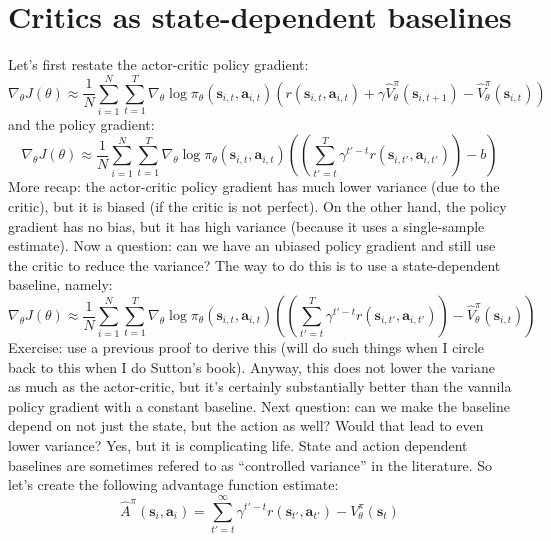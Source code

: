 \documentclass{report}
\begin{document}
\section{Critics as state-dependent baselines}
Let's first restate the actor-critic policy gradient:
\begin{equation}
	\nabla_\theta J(\theta) \approx \frac{1}{N} \sum_{i=1}^{N} \sum_{t=1}^{T} \nabla_{\theta} \log \pi_\theta(\bm{s}_{i,t}, \bm{a}_{i,t})
		\left( r(\bm{s}_{i,t}, \bm{a}_{i,t}) + \gamma \hat{V}^\pi_\theta(\bm{s}_{i,t+1}) - \hat{V}^\pi_\theta(\bm{s}_{i,t}) \right) 
\end{equation}
and the policy gradient:
\begin{equation}
		\nabla_\theta J(\theta) \approx \frac{1}{N} \sum_{i=1}^{N} \sum_{t=1}^{T} \nabla_{\theta} \log \pi_\theta(\bm{s}_{i,t}, \bm{a}_{i,t})
		\left( \left( \sum_{t'=t}^{T} \gamma^{t' -t} r(\bm{s}_{i,t'}, \bm{a}_{i,t'}) \right) -b \right) 
\end{equation}
More recap: the actor-critic policy gradient has much lower variance (due to the critic), but it is biased (if the critic is not perfect).
On the other hand, the policy gradient has no bias, but it has high variance (because it uses a single-sample estimate).
Now a question: can we have an ubiased policy gradient and still use the critic to reduce the variance?
The way to do this is to use a state-dependent baseline, namely:
\begin{equation}
		\nabla_\theta J(\theta) \approx \frac{1}{N} \sum_{i=1}^{N} \sum_{t=1}^{T} \nabla_{\theta} \log \pi_\theta(\bm{s}_{i,t}, \bm{a}_{i,t})
		\left( \left( \sum_{t'=t}^{T} \gamma^{t' -t} r(\bm{s}_{i,t'}, \bm{a}_{i,t'}) \right)  - \hat{V}^\pi_\theta(\bm{s}_{i,t}) \right) 
\end{equation}
Exercise: use a previous proof to derive this (will do such things when I circle back to this when I do Sutton's book).
Anyway, this does not lower the variane as much as the actor-critic, but it's certainly substantially better than the vannila policy gradient with a constant baseline.
Next question: can we make the baseline depend on not just the state, but the action as well? Would that lead to even lower variance?
Yes, but it is complicating life.
State and action dependent baselines are sometimes refered to as ``controlled variance'' in the literature.
So let's create the following advantage function estimate:
\begin{equation}
		\hat{A}^\pi (\bm{s}_{i}, \bm{a}_{i}) = \sum_{t'=t}^{\infty} \gamma^{t'-t} r(\bm{s}_{t'}, \bm{a}_{t'}) - V^\pi_\theta(\bm{s}_t)
\end{equation}
\end{document}
